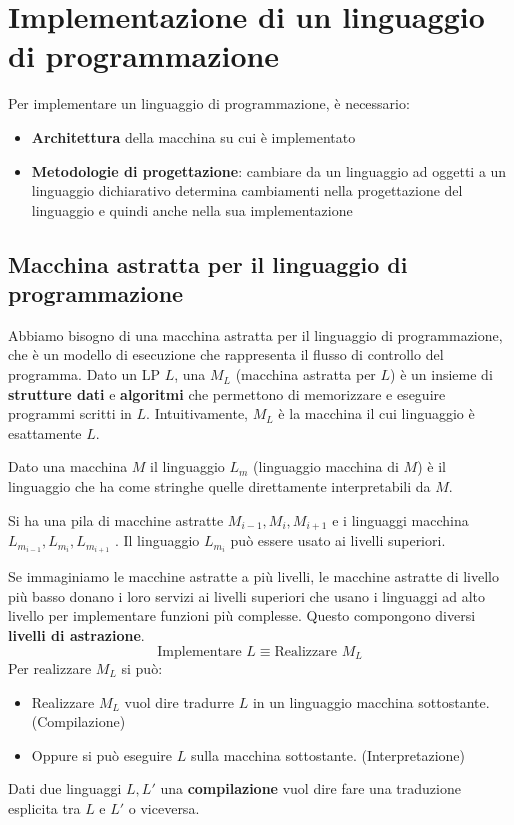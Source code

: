 \documentclass[a4paper]{article}
\begin{document}
\section{Implementazione di un linguaggio di programmazione}

Per implementare un linguaggio di programmazione, è necessario:
\begin{itemize}
    \item \textbf{Architettura} della macchina su cui è implementato
    \item \textbf{Metodologie di progettazione}: cambiare da un linguaggio ad oggetti a un linguaggio 
    dichiarativo determina cambiamenti nella progettazione del linguaggio e quindi anche nella sua implementazione
\end{itemize}

\subsection{Macchina astratta per il linguaggio di programmazione}

Abbiamo bisogno di una macchina astratta per il linguaggio di programmazione,
che è un modello di esecuzione che rappresenta il flusso di controllo del programma.
{
    Dato un LP $L$, una $M_L$ (macchina astratta per $L$) è un insieme di \textbf{strutture dati}
    e \textbf{algoritmi} che permettono di memorizzare e eseguire programmi scritti in $L$. 
    Intuitivamente, $M_L$ è la macchina il cui linguaggio è esattamente $L$.
}
\noindent

{
    Dato una macchina $M$ il linguaggio $L_m$ (linguaggio macchina di $M$)
    è il linguaggio che ha come stringhe quelle direttamente interpretabili da $M$. 

    Si ha una pila di macchine astratte 
    $M_{i-1}, M_i, M_{i+1}$ e i linguaggi macchina $L_{m_{i-1}}, L_{m_i}, L_{m_{i+1}}$ .
    Il linguaggio $L_{m_i}$ può essere usato ai livelli superiori.
}


\noindent
Se immaginiamo le macchine astratte a più livelli, le macchine astratte di livello più basso
donano i loro servizi ai livelli superiori che usano i linguaggi ad alto livello per implementare 
funzioni più complesse. Questo compongono diversi \textbf{livelli di astrazione}.
\[
\text{Implementare } L \equiv \text{Realizzare } M_L
\]
Per realizzare $M_L$ si può:
\begin{itemize}
    \item Realizzare $M_L$ vuol dire tradurre $L$ in un linguaggio macchina sottostante. (Compilazione)
    \item Oppure si può eseguire $L$ sulla macchina sottostante. (Interpretazione)
\end{itemize}
{
    Dati due linguaggi $L, L'$ una \textbf{compilazione} vuol dire fare una traduzione esplicita tra $L$ e $L'$ o
    viceversa.
}
\end{document}
